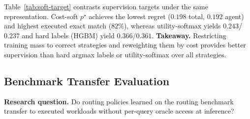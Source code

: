 Table~\ref{tab:soft-target} contrasts supervision targets under the same representation.
Cost-soft $p^\star$ achieves the lowest regret ($0.198$ total, $0.192$ agent) and highest
executed exact match ($82\%$), whereas utility-softmax yields $0.243$/$0.237$ and hard
labels (HGBM) yield $0.366$/$0.361$.
\textbf{Takeaway.}
Restricting training mass to correct strategies and reweighting them by cost provides
better supervision than hard argmax labels or utility-softmax over all strategies.

\subsection{Benchmark Transfer Evaluation}
\label{sec:benchmark-transfer}
\label{sec:deployment-evaluation}

\textbf{Research question.}
Do routing policies learned on the routing benchmark transfer to executed workloads
without per-query oracle access at inference?

